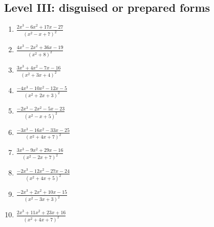 \documentclass[11pt,oneside]{book}
\begin{document}
\subsection*{Level III: disguised or prepared forms}
\begin{enumerate}[leftmargin=*,label=\textbf{\arabic*.},itemsep=0.65\baselineskip]
\item $\displaystyle \frac{2 x^{3} - 6 x^{2} + 17 x - 27}{\left(x^{2} - x + 7\right)^{2}}$
\item $\displaystyle \frac{4 x^{3} - 2 x^{2} + 36 x - 19}{\left(x^{2} + 8\right)^{2}}$
\item $\displaystyle \frac{3 x^{3} + 4 x^{2} - 7 x - 16}{\left(x^{2} + 3 x + 4\right)^{2}}$
\item $\displaystyle \frac{- 4 x^{3} - 10 x^{2} - 12 x - 5}{\left(x^{2} + 2 x + 3\right)^{2}}$
\item $\displaystyle \frac{- 2 x^{3} - 2 x^{2} - 5 x - 23}{\left(x^{2} - x + 5\right)^{2}}$
\item $\displaystyle \frac{- 3 x^{3} - 16 x^{2} - 33 x - 25}{\left(x^{2} + 4 x + 7\right)^{2}}$
\item $\displaystyle \frac{3 x^{3} - 9 x^{2} + 29 x - 16}{\left(x^{2} - 2 x + 7\right)^{2}}$
\item $\displaystyle \frac{- 2 x^{3} - 12 x^{2} - 27 x - 24}{\left(x^{2} + 4 x + 5\right)^{2}}$
\item $\displaystyle \frac{- 2 x^{3} + 2 x^{2} + 10 x - 15}{\left(x^{2} - 3 x + 3\right)^{2}}$
\item $\displaystyle \frac{2 x^{3} + 11 x^{2} + 23 x + 16}{\left(x^{2} + 4 x + 7\right)^{2}}$
\end{enumerate}
\end{document}
